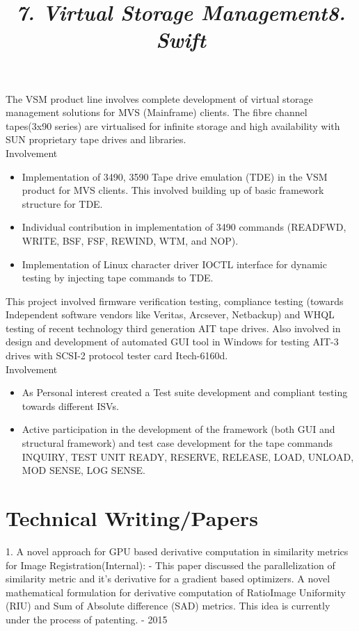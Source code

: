 \begin{resume}
\title{\em 7. Virtual Storage Management}

\begin{position}
The VSM product line involves complete development of virtual storage management solutions for MVS (Mainframe) clients. The fibre channel tapes(3x90 series) are virtualised for infinite storage and high availability with SUN proprietary tape drives and libraries. \\

Involvement
\begin{itemize}
\item  Implementation of 3490, 3590 Tape drive emulation (TDE) in the VSM product for MVS clients. This involved building up of basic framework structure for TDE.
\item Individual contribution in implementation of 3490 commands (READFWD, WRITE, BSF, FSF, REWIND, WTM, and NOP).
\item Implementation of Linux character driver IOCTL interface for dynamic testing by injecting tape commands to TDE.
\end{itemize}
\end{position}
\hrulefill

\title{\em 8. Swift}

\begin{position}
This project involved firmware verification testing, compliance testing (towards Independent software vendors like Veritas, Arcsever, Netbackup) and WHQL testing of recent technology third generation AIT tape drives. Also involved in design and development of automated GUI tool in Windows for testing AIT-3 drives with SCSI-2 protocol tester card Itech-6160d.\\

Involvement
\begin{itemize}
\item As Personal interest created a Test suite development and compliant testing towards different ISVs.
\item Active participation in the development of the framework (both GUI and structural framework) and test case development for the tape commands INQUIRY, TEST UNIT READY, RESERVE, RELEASE, LOAD, UNLOAD, MOD SENSE, LOG SENSE.
\end{itemize}
\end{position}
\hrulefill

\section{\sc Technical Writing/Papers}
1. A novel approach for GPU based derivative computation in similarity metrics for Image Registration(Internal): - This paper discussed the parallelization of similarity metric and it's derivative for a gradient based optimizers. A novel mathematical formulation for derivative computation of RatioImage Uniformity (RIU) and Sum of Absolute difference (SAD) metrics. This idea is currently under the process of patenting. - 2015


\end{resume}
